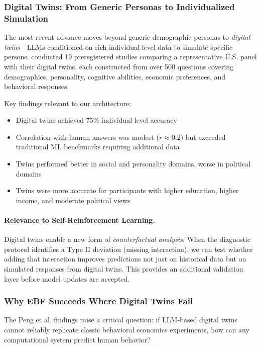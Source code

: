 \subsubsection{Digital Twins: From Generic Personas to Individualized Simulation}

The most recent advance moves beyond generic demographic personas to 
\emph{digital twins}---LLMs conditioned on rich individual-level data to 
simulate specific persons. \citet{peng2025} conducted 19 preregistered studies 
comparing a representative U.S. panel with their digital twins, each constructed 
from over 500 questions covering demographics, personality, cognitive abilities, 
economic preferences, and behavioral responses.

Key findings relevant to our architecture:
\begin{itemize}
    \item Digital twins achieved 75\% individual-level accuracy
    \item Correlation with human answers was modest ($r \approx 0.2$) but 
          exceeded traditional ML benchmarks requiring additional data
    \item Twins performed better in social and personality domains, worse in 
          political domains
    \item Twins were more accurate for participants with higher education, 
          higher income, and moderate political views
\end{itemize}

\paragraph{Relevance to Self-Reinforcement Learning.}
Digital twins enable a new form of \emph{counterfactual analysis}. When the 
diagnostic protocol identifies a Type II deviation (missing interaction), we 
can test whether adding that interaction improves predictions not just on 
historical data but on simulated responses from digital twins. This provides 
an additional validation layer before model updates are accepted.


\subsubsection{Why EBF Succeeds Where Digital Twins Fail}
\label{subsec:ebf-vs-twins}

The Peng et al. findings raise a critical question: if LLM-based digital twins 
cannot reliably replicate classic behavioral economics experiments, how can 
any computational system predict human behavior?

